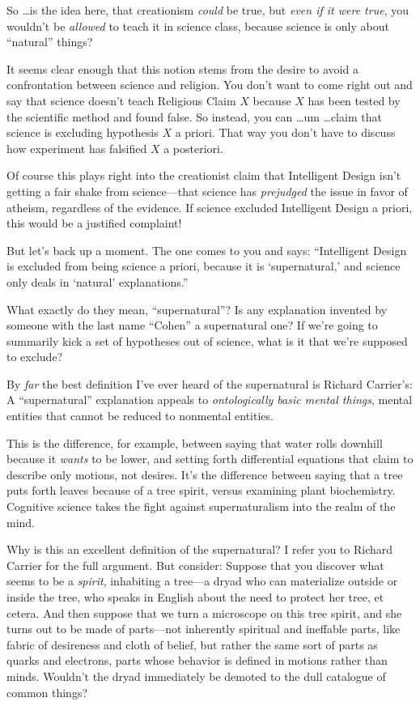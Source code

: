 {
 So \ldots is the idea here, that creationism \textit{could} be
true, but \textit{even if it were true}, you wouldn't
be \textit{allowed} to teach it in science class, because science is
only about ``natural'' things?}

{
 It seems clear enough that this notion stems from the desire to
avoid a confrontation between science and religion. You
don't want to come right out and say that science
doesn't teach Religious Claim $X$ because $X$ has been
tested by the scientific method and found false. So instead, you can
\ldots um \ldots claim that science is excluding hypothesis $X$ a priori.
That way you don't have to discuss how experiment has
falsified $X$ a posteriori.}

{
 Of course this plays right into the creationist claim that
Intelligent Design isn't getting a fair shake from
science---that science has \textit{prejudged} the issue in favor of
atheism, regardless of the evidence. If science excluded Intelligent
Design a priori, this would be a justified complaint!}

{
 But let's back up a moment. The one comes to you
and says: ``Intelligent Design is excluded from being
science a priori, because it is
`supernatural,' and science only deals
in `natural'
explanations.''}

{
 What exactly do they mean,
``supernatural''? Is any explanation
invented by someone with the last name
``Cohen'' a supernatural one? If
we're going to summarily kick a set of hypotheses out
of science, what is it that we're supposed to exclude?}

{
 By \textit{far} the best definition I've ever
heard of the supernatural is Richard Carrier's: A
``supernatural'' explanation appeals
to \textit{ontologically basic mental things}, mental entities that
cannot be reduced to nonmental entities.}

{
 This is the difference, for example, between saying that water
rolls downhill because it \textit{wants} to be lower, and setting forth
differential equations that claim to describe only motions, not
desires. It's the difference between saying that a tree
puts forth leaves because of a tree spirit, versus examining plant
biochemistry. Cognitive science takes the fight against supernaturalism
into the realm of the mind.}

{
 Why is this an excellent definition of the supernatural? I refer
you to Richard Carrier for the full argument. But consider: Suppose
that you discover what seems to be a \textit{spirit}, inhabiting a
tree---a dryad who can materialize outside or inside the tree, who
speaks in English about the need to protect her tree, et cetera. And
then suppose that we turn a microscope on this tree spirit, and she
turns out to be made of parts---not inherently spiritual and ineffable
parts, like fabric of desireness and cloth of belief, but rather the
same sort of parts as quarks and electrons, parts whose behavior is
defined in motions rather than minds. Wouldn't the
dryad immediately be demoted to the dull catalogue of common things?}

